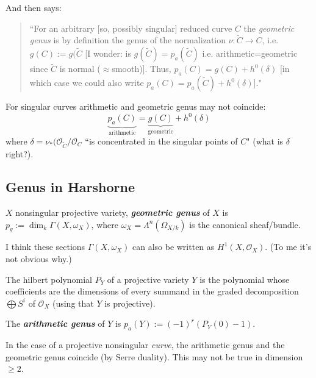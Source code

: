 And then \cite{huk} says:
\begin{quotation}
	``For an arbitrary [so, possibly singular] reduced curve \(C\) the \textit{geometric genus} is by definition the genus of the normalization \(\nu:\tilde{C} \to C\), i.e. \(g(C):=g(\tilde{C}\) [I wonder: is \(g(\tilde{C})=p_a(\tilde{C})\) i.e. arithmetic=geometric since  \(\tilde{C}\) is normal (\(\approx\)smooth)]. Thus, \(p_a(C)=g(C)+h^{0}(\delta)\) [in which case we could also write  \(p_a(C)=p_a(\tilde{C})+h^{0}(\delta)\)]."
\end{quotation}

\begin{upshot}\leavevmode
For singular curves arithmetic and geometric genus may not coincide:
\[\underbrace{p_a(C)}_{\text{arithmetic} }=\underbrace{g(C)}_{\text{geometric} }+h^0(\delta)\]
where \(\delta=\nu_*(\mathcal{O}_{\tilde{C}}/\mathcal{O}_C\) ``is concentrated in the singular points of \(C\)" (what is \(\delta\) right?).

\end{upshot}

\subsection{Genus in Harshorne}
\begin{defn}\leavevmode
\(X\) nonsingular projective variety, \textit{\textbf{geometric genus}} of \(X\) is \(p_g:=\dim_k\Gamma(X,\omega_X)\), where \(\omega_X=\Lambda^{n}(\Omega_{X/k})\) is the canonical sheaf/bundle.
\end{defn}

\begin{remark}\leavevmode
I think these sections \(\Gamma(X,\omega_X)\) can also be written as \(H^{1}(X,\mathcal{O}_X)\). (To me it's not obvious why.)
\end{remark}

\begin{defn}[p. 54]\leavevmode
The hilbert polynomial \(P_Y\) of a projective variety  \(Y\) is the polynomial whose coefficients are the dimensions of every summand in the graded decomposition \(\bigoplus S^i\) of \(\mathcal{O}_X\) (using that \(Y\) is projective).

The \textit{\textbf{arithmetic genus}} of \(Y\) is \(p_a(Y):=(-1)^{r}(P_Y(0)-1).\)
\end{defn}

\begin{remark}\leavevmode
	In the case of a projective nonsingular \textit{curve}, the arithmetic genus and the geometric genus coincide (by Serre duality). This may not be true in dimension \(\geq 2\).
\end{remark}

